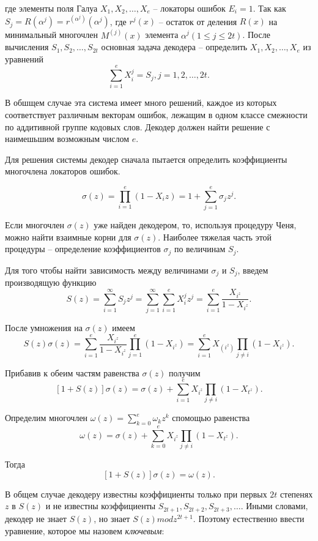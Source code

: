 где элементы поля Галуа $X_1, X_2, \ldots, X_e$ -- локаторы ошибок $E_i=1$. Так как
$S_j=R(\alpha^j)=r^{(\alpha^j)}(\alpha^j)$, где $r^j(x)$ -- остаток от деления $R(x)$ на минимальный
многочлен $M^{(j)}(x)$ элемента $\alpha^j(1\le j \le 2t)$. После вычисления $S_1, S_2, \ldots, S_{2t}$
основная задача декодера -- определить $X_1, X_2, \ldots, X_e$ из уравнений
$$\sum\limits_{i=1}^{e} X_i^j=S_j,  j=1, 2, \ldots, 2t.$$

В обшщем случае эта система имеет много решений, каждое из которых соответствует различным векторам
ошибок, лежащим в одном классе смежности по аддитивной группе кодовых слов. Декодер должен найти решение
с наимешьшим возможным числом $e$.

Для решения системы декодер сначала пытается определить коэффициенты многочлена локаторов ошибок.

\begin{definition} 
$$\sigma(z)=\prod\limits_{i=1}^{e}(1-X_i z)=1+\sum\limits_{j=1}^{e}\sigma_j z^j.$$
\end{definition}

Если многочлен $\sigma(z)$ уже найден декодером, то, используя процедуру Ченя, можно найти взаимные
корни для $\sigma(z)$. Наиболее тяжелая часть этой процедуры -- определение коэффициентов $\sigma_j$
по величинам $S_j$.

Для того чтобы найти зависимость между величинами $\sigma_j$ и $S_j$, введем производящую функцию
$$S(z)=\sum\limits_{i=1}^{\infty}S_j z^j=\sum\limits_{j=1}^{\infty}\sum\limits_{i=1}^{e}X_i^j z^j=
\sum\limits_{i=1}^{e}\frac{X_{i^z}}{1-X_{i^z}}.$$

После умножения на $\sigma(z)$ имеем
$$S(z)\sigma(z)=\sum\limits_{i=1}^{e}\frac{X_{i^z}}{1-X_{i^z}}\prod\limits_{j=1}^{e}(1-X_{i^z})=
\sum\limits_{i=1}^{e}X_(i^z)\prod\limits_{j\ne i}^{}(1-X_{i^z}).$$

Прибавив к обеим частям равенства $\sigma(z)$ получим
$$[1+S(z)]\sigma(z)=\sigma(z)+\sum\limits_{i=1}^{e}X_{i^z}\prod\limits_{j\ne i}^{}(1-X_{t^z}).$$

Определим многочлен $\omega(z)=\sum\limits_{k=0}^{e}\omega_k z^k$  спомощью равенства
$$\omega(z)=\sigma(z)+\sum\limits_{k=0}^{e}X_{i^z}\prod\limits_{j\ne i}^{}(1-X_{t^z}).$$

Тогда
$$[1+S(z)]\sigma(z)=\omega(z).$$

В общем случае декодеру известны коэффициенты только при первых $2t$ степенях $z$ в $S(z)$
и не известны коэффициенты $S_{2t+1}, S_{2t+2}, S_{2t+3}, \ldots .$ Иными словами, декодер
не знает $S(z)$, но знает $S(z)mod z^{2t+1}.$ Поэтому естественно ввести уравнение, которое
мы назовем \textit{ключевым}:

